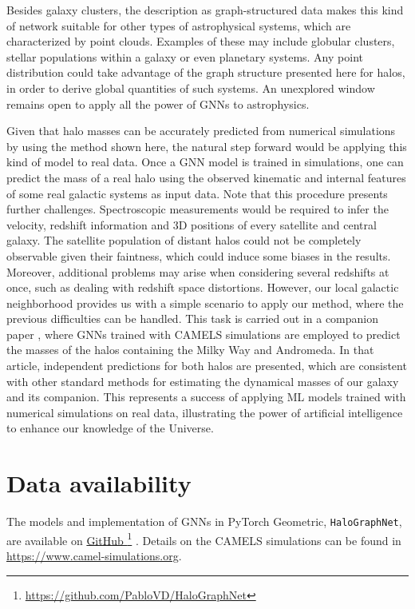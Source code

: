 \documentclass[twocolumn]{aastex631}
\begin{document}
Besides galaxy clusters, the description as graph-structured data makes this kind of network suitable for other types of astrophysical systems, which are characterized by point clouds. Examples of these may include globular clusters, stellar populations within a galaxy or even  planetary systems. Any point distribution could take advantage of the graph structure presented here for halos, in order to derive global quantities of such systems. An unexplored window remains open to apply all the power of GNNs to astrophysics. 

Given that halo masses can be accurately predicted from numerical simulations by using the method shown here, the natural step forward would be applying this kind of model to real data. Once a GNN model is trained in simulations, one can predict the mass of a real halo using the observed kinematic and internal features of some real galactic systems as input data. Note that this procedure presents further challenges. Spectroscopic measurements would be required to infer the velocity, redshift information and 3D positions of every satellite and central galaxy. The satellite population of distant halos could not be completely observable given their faintness, which could induce some biases in the results. Moreover, additional problems may arise when considering several redshifts at once, such as dealing with redshift space distortions. However, our local galactic neighborhood provides us with a simple scenario to apply our method, where the previous difficulties can be handled. This task is carried out in a companion paper \citep{GNN_MW_M31}, where GNNs trained with CAMELS simulations are employed to predict the masses of the halos containing the Milky Way and Andromeda. In that article, independent predictions for both halos are presented, which are consistent with other standard methods for estimating the dynamical masses of our galaxy and its companion. This represents a success of applying ML models trained with numerical simulations on real data, illustrating the power of artificial intelligence to enhance our knowledge of the Universe. 







\section*{Data availability}

The models and implementation of GNNs in PyTorch Geometric, {\tt HaloGraphNet}, are available on  \href{https://github.com/PabloVD/HaloGraphNet}{GitHub }\footnote{\url{https://github.com/PabloVD/HaloGraphNet}} \citep{HaloGraphNet}. Details on the CAMELS simulations can be found in \url{https://www.camel-simulations.org}.
\end{document}
